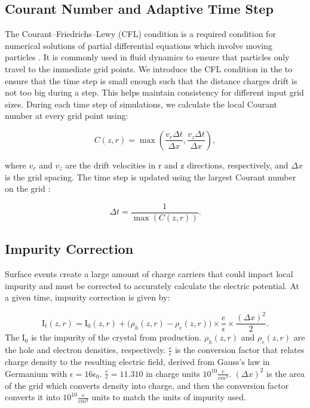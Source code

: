 \subsection{Courant Number and Adaptive Time Step}

The Courant–Friedrichs–Lewy (CFL) condition is a required condition for numerical solutions of partial differential equations which involve moving particles \cite{cfl_condition}. It is commonly used in fluid dynamics to ensure that particles only travel to the immediate grid points. We introduce the CFL condition in the {\ehd} to ensure that the time step is small enough such that the distance charges drift is not too big during a step. This helps maintain consistency for different input grid sizes. During each time step of simulations, we calculate the local Courant number at every grid point using:

\begin{equation}
C(z,r) = \max \left( \frac{v_r \Delta t}{\Delta x}, \frac{v_z \Delta t}{\Delta x} \right),
\end{equation}

where \( v_r \) and \( v_z \) are the drift velocities in r and z directions, respectively, and  \( \Delta x \) is the grid spacing. The time step is updated using the largest Courant number on the grid :

\begin{equation}
\Delta t = \frac{1}{\max (C(z,r))}.
\end{equation}



\subsection{Impurity Correction}
Surface events create a large amount of charge carriers that could impact local impurity and must be corrected to accurately calculate the electric potential. At a given time, impurity correction is given by:

\begin{equation}
  {\text{I}_{t}}(z, r) = \text{I}_{0}(z, r) +
  \bigl( \rho_h(z, r) - \rho_e(z, r) \bigr) \times \frac{e}{\epsilon} \times \frac{(\Delta x)^2}{2}.
\end{equation}
The $\text{I}_{0}$ is the impurity of the crystal from production. $\rho_h(z,r)$ and $\rho_e(z,r)$ are the hole and electron densities, respectively. $\frac{e}{\epsilon}$ is the conversion factor that relates charge density to the resulting electric field, derived from Gauss’s law in Germanium with $\epsilon = 16\epsilon_0$. $\frac{e}{\epsilon} = 11.310$ in 
charge units $10^{10}\frac{e}{cm^3}$. $(\Delta x)^2$ is the area of the grid which converts density into charge, and then the conversion factor converts it into $10^{10}\frac{e}{cm^3}$ units to match the units of impurity used.

